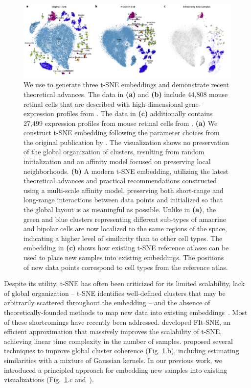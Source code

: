 \documentclass[article]{jss}
\newcommand{\opentsne}{\pkg{openTSNE}\xspace}
\begin{document}
\begin{figure}[ht]
  \includegraphics[width=\textwidth]{macosko2015}
  \caption{\label{fig:macosko}
We use \opentsne to generate three t-SNE embeddings and demonstrate recent theoretical advances. The data in \textbf{(a)} and \textbf{(b)} include 44,808 mouse retinal cells that are described with high-dimensional gene-expression profiles from \citet{macosko2015highly}. The data in \textbf{(c)} additionally contains 27,499 expression profiles from mouse retinal cells from \citet{shekhar2016comprehensive}. \textbf{(a)} We construct t-SNE embedding following the parameter choices from the original publication by \citet{maaten2008visualizing}. The visualization shows no preservation of the global organization of clusters, resulting from random initialization and an affinity model focused on preserving local neighborhoods. \textbf{(b)} A modern t-SNE embedding, utilizing the latest theoretical advances and practical recommendations constructed using a multi-scale affinity model, preserving both short-range and long-range interactions between data points and initialized so that the global layout is as meaningful as possible. Unlike in \textbf{(a)}, the green and blue clusters representing different sub-types of amacrine and bipolar cells are now localized to the same regions of the space, indicating a higher level of similarity than to other cell types. The embedding in \textbf{(c)} shows how existing t-SNE reference atlases can be used to place new samples into existing embeddings. The positions of new data points correspond to cell types from the reference atlas.
}
\end{figure}

Despite its utility, t-SNE has often been criticized for its limited scalability, lack of global organization -- t-SNE identifies well-defined clusters that may be arbitrarily scattered throughout the embedding -- and the absence of theoretically-founded methods to map new data into existing embeddings~\citep{ding2018interpretable,becht2019dimensionality}. Most of these shortcomings have recently been addressed. \citet{linderman2019fast} developed FIt-SNE, an efficient approximation that massively improves the scalability of t-SNE, achieving linear time complexity in the number of samples. \citet{kobak2019art} proposed several techniques to improve global cluster coherence (Fig. \ref{fig:macosko}.b), including estimating similarities with a mixture of Gaussian kernels. In our previous work, we introduced a principled approach for embedding new samples into existing visualizations (Fig.~\ref{fig:macosko}.c and~\citet{policar2021embedding}).
\end{document}
